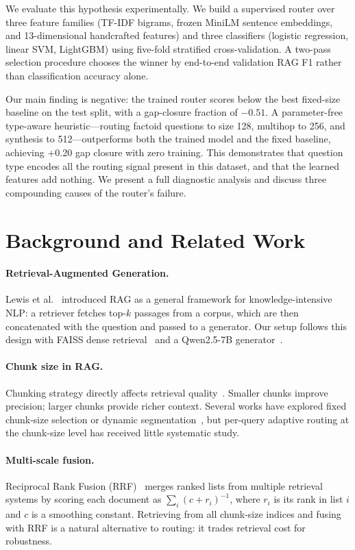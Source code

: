 \documentclass{article}
\begin{document}
We evaluate this hypothesis experimentally. We build a supervised router
over three feature families (TF-IDF bigrams, frozen MiniLM sentence
embeddings, and 13-dimensional handcrafted features) and three classifiers
(logistic regression, linear SVM, LightGBM) using five-fold stratified
cross-validation. A two-pass selection procedure chooses the winner by
end-to-end validation RAG F1 rather than classification accuracy alone.

Our main finding is negative: the trained router scores below the best
fixed-size baseline on the test split, with a gap-closure fraction of
$-0.51$. A parameter-free type-aware heuristic---routing factoid questions
to size 128, multihop to 256, and synthesis to 512---outperforms both the
trained model and the fixed baseline, achieving +0.20 gap closure with zero
training. This demonstrates that question type encodes all the routing
signal present in this dataset, and that the learned features add nothing.
We present a full diagnostic analysis and discuss three compounding causes of
the router's failure.

\section{Background and Related Work}

\paragraph{Retrieval-Augmented Generation.}
Lewis et al.~\cite{lewis2020rag} introduced RAG as a general framework for
knowledge-intensive NLP: a retriever fetches top-$k$ passages from a corpus,
which are then concatenated with the question and passed to a generator.
Our setup follows this design with FAISS dense retrieval~\cite{johnson2019faiss}
and a Qwen2.5-7B generator~\cite{qwen2025}.

\paragraph{Chunk size in RAG.}
Chunking strategy directly affects retrieval quality~\cite{lewis2020rag}.
Smaller chunks improve precision; larger chunks provide richer context.
Several works have explored fixed chunk-size selection or dynamic
segmentation~\cite{shi2024large}, but per-query adaptive routing at the
chunk-size level has received little systematic study.

\paragraph{Multi-scale fusion.}
Reciprocal Rank Fusion (RRF)~\cite{cormack2009rrf} merges ranked lists from
multiple retrieval systems by scoring each document as
$\sum_i (c + r_i)^{-1}$, where $r_i$ is its rank in list $i$ and $c$ is a
smoothing constant. Retrieving from all chunk-size indices and fusing with
RRF is a natural alternative to routing: it trades retrieval cost for
robustness.
\end{document}
